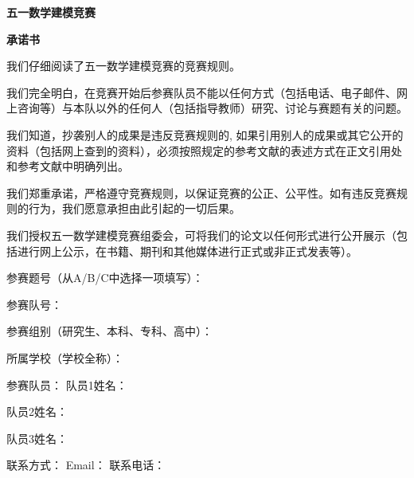 \documentclass[withoutpreface,bwprint]{cumcmthesis}
\begin{document}


\noindent 

\noindent 

\noindent 

\noindent 

\begin{center}
 {\huge \textbf{五一数学建模竞赛}} 
\end{center}
\begin{center}
	{\LARGE  \textbf{承\quad 诺\quad  书}} 
\end{center}


我们仔细阅读了五一数学建模竞赛的竞赛规则。

我们完全明白，在竞赛开始后参赛队员不能以任何方式（包括电话、电子邮件、网上咨询等）与本队以外的任何人（包括指导教师）研究、讨论与赛题有关的问题。

我们知道，抄袭别人的成果是违反竞赛规则的, 如果引用别人的成果或其它公开的资料（包括网上查到的资料），必须按照规定的参考文献的表述方式在正文引用处和参考文献中明确列出。

我们郑重承诺，严格遵守竞赛规则，以保证竞赛的公正、公平性。如有违反竞赛规则的行为，我们愿意承担由此引起的一切后果。

我们授权五一数学建模竞赛组委会，可将我们的论文以任何形式进行公开展示（包括进行网上公示，在书籍、期刊和其他媒体进行正式或非正式发表等）。

 参赛题号（从A/B/C中选择一项填写）：\underbar{\qquad\qquad\qquad\qquad\qquad\qquad\qquad\qquad\qquad}

参赛队号：\underbar{\qquad\qquad\qquad\qquad\qquad\qquad\qquad\qquad\qquad\qquad\qquad\qquad\qquad\qquad\qquad}

参赛组别（研究生、本科、专科、高中）：\underbar{\qquad\qquad\qquad\qquad\qquad\qquad\qquad\qquad\qquad}

所属学校（学校全称）：\underbar{\qquad\qquad\qquad\qquad\qquad\qquad\qquad\qquad\qquad}

参赛队员： 队员1姓名：\underbar{\qquad\qquad\qquad\qquad\qquad\qquad\qquad\qquad\qquad}

\qquad\qquad\quad 队员2姓名：\underbar{\qquad\qquad\qquad\qquad\qquad\qquad\qquad\qquad\qquad}

\qquad\qquad\quad 队员3姓名：\underbar{\qquad\qquad\qquad\qquad\qquad\qquad\qquad\qquad\qquad}   

联系方式： Email：\underbar{\qquad\qquad\qquad\qquad} 联系电话：\underbar{\qquad\qquad\qquad\qquad}                      
\end{document}
